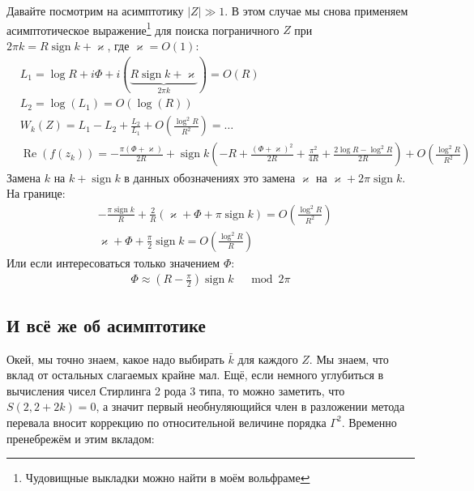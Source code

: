 \documentclass[a4paper, 12pt]{article}
\DeclareMathOperator*{\sign}{sign}
\DeclareMathOperator*{\Real}{Re}
\begin{document}
Давайте посмотрим на асимптотику $|Z|\gg 1$. В этом случае мы снова применяем асимптотическое выражение\footnote{Чудовищные выкладки можно найти в моём вольфраме} для поиска пограничного $Z$ при $2\pi k= R\sign k + \varkappa$, где $\varkappa = O(1)$:
\begin{equation}
\begin{aligned}
    &L_1 = \log R + i \Phi + i\left(\underbrace{R\sign k + \varkappa}_{2\pi k}\right) = O(R)\\
    &L_2 = \log(L_1) = O(\log(R))\\
    &W_k(Z) = L_1 - L_2 + \frac{L_2}{L_1} + O\left(\frac{\log^2 R}{R^2}\right) = \dots\\
    &\Real(f(z_k)) =  -\frac{\pi \left(\Phi+\varkappa\right)}{2R} + \sign k 
    \left(-R + \frac{\left(\Phi + \varkappa\right)^2}{2R}+\frac{\pi^2}{4R} + \frac{2\log R - \log^2 R}{2R}\right) +
     O\left(\frac{\log^2 R}{R^2}\right)
\end{aligned}
\end{equation}
Замена $k$ на $k+\sign k$ в данных обозначениях это замена $\varkappa$ на $\varkappa + 2\pi\sign k$. На границе:
\begin{equation}
\begin{aligned}
    &-\frac{\pi\sign k}{R} + \frac{2}{R}
    \left(\varkappa + \Phi + \pi\sign k\right) = O\left(\frac{\log^2 R}{R^2}\right)\\
    &\varkappa + \Phi + \frac{\pi}{2}\sign k= O\left(\frac{\log^2 R}{R}\right)
\end{aligned}
\end{equation}
Или если интересоваться только значением $\Phi$:
\begin{equation}
\begin{aligned}
    \Phi \approx \left(R-\frac{\pi}{2}\right)\sign k \;\;\; \mod 2\pi
\end{aligned}
\end{equation}

\subsection*{И всё же об асимптотике}

Окей, мы точно знаем, какое надо выбирать $\bar k$ для каждого $Z$. Мы знаем, что вклад от остальных слагаемых крайне мал. Ещё, если немного углубиться в вычисления чисел Стирлинга 2 рода 3 типа, то можно заметить, что $S(2, 2+2k)=0$, а значит первый необнуляющийся член в разложении метода перевала вносит коррекцию по относительной величине порядка $\Gamma^2$. Временно пренебрежём и этим вкладом:
\end{document}
